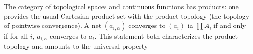The category of topological spaces and continuous functions has products: one provides the usual Cartesian product set with the product topology (the topology of pointwise convergence). A net $(a_{i,\alpha})$ converges to $(a_i)$ in $\prod A_i$ if and only if for all $i$, $a_{i,\alpha}$ converges to $a_i$. This statement both characterizes the product topology and amounts to the universal property.
